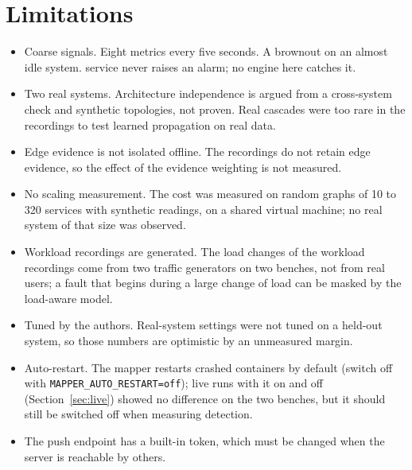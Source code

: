 \section{Limitations}
\begin{itemize}
\item Coarse signals. Eight metrics every five seconds. A brownout on an almost idle system. service never raises an alarm; no engine here catches it.
\item Two real systems. Architecture independence is argued from a cross-system check and synthetic topologies, not proven. Real cascades were too rare in the recordings to test learned propagation on real data.
\item Edge evidence is not isolated offline. The recordings do not retain edge evidence, so the effect of the evidence weighting is not measured.
\item No scaling measurement. The cost was measured on random graphs of 10 to 320 services with synthetic readings, on a shared virtual machine; no real system of that size was observed.
\item Workload recordings are generated. The load changes of the workload recordings come from two traffic generators on two benches, not from real users; a fault that begins during a large change of load can be masked by the load-aware model.
\item Tuned by the authors. Real-system settings were not tuned on a held-out system, so those numbers are optimistic by an unmeasured margin.
\item Auto-restart. The mapper restarts crashed containers by default (switch off with \texttt{MAPPER\_AUTO\_RESTART=off}); live runs with it on and off (Section~\ref{sec:live}) showed no difference on the two benches, but it should still be switched off when measuring detection.
\item The push endpoint has a built-in token, which must be changed when the server is reachable by others.
\end{itemize}

